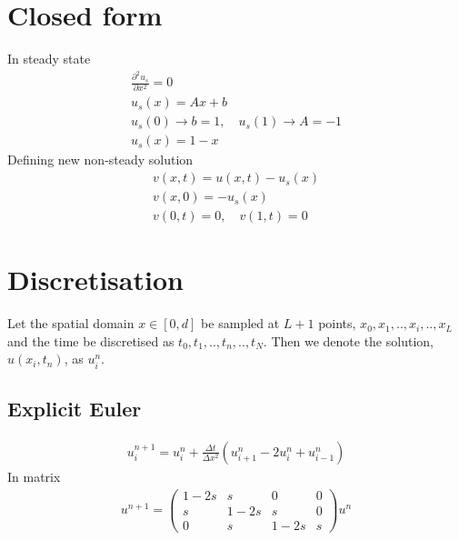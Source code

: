 \documentclass[11pt,a4paper,draft]{article}
\numberwithin{equation}{section}
\begin{document}
\section{Closed form}
In steady state
\begin{gather}
\frac{\partial^2 u_s}{\partial x^2} = 0\\
u_s(x) = Ax + b\\
u_s(0) \to b = 1, \quad
u_s(1) \to A = -1\\
u_s(x) = 1-x
\end{gather}
Defining new non-steady solution
\begin{gather}
v(x,t) = u(x,t) - u_s(x)\\
v(x,0) = -u_s(x)\\
v(0,t) = 0, \quad v(1, t) = 0
\end{gather}


\section{Discretisation}

Let the spatial domain $x \in [0,d]$ be sampled at $L+1$ points, $x_0,x_1,..,x_i,..,x_L$ and the time be discretised as $t_0,t_1,..,t_n,..,t_N$. Then we denote the solution, $u(x_i,t_n)$, as $u_i^n$.  

\subsection{Explicit Euler}

\begin{gather}
u_i^{n+1} = u_i^n + \frac{\Delta t}{\Delta x^2}\left(
u_{i+1}^n - 2u_i^n + u_{i-1}^n
\right)
\end{gather}
In matrix
\begin{gather}
u^{n+1} = 
\begin{pmatrix}
1 - 2s & s & 0 & 0\\
s & 1 - 2s & s & 0\\
0 & s & 1-2s & s
\end{pmatrix}u^n
\end{gather}
\end{document}
